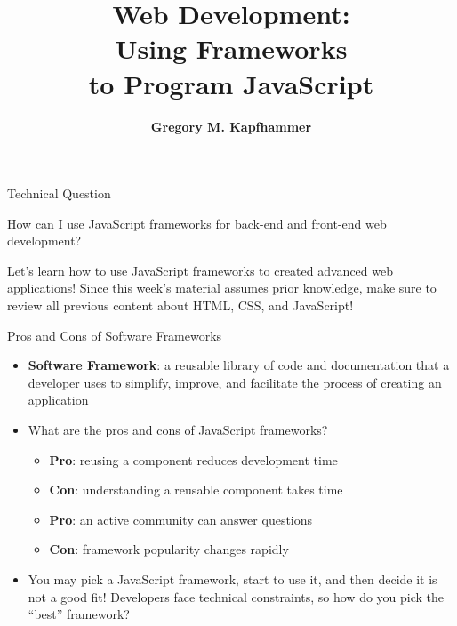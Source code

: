 \documentclass[14pt,aspectratio=169]{beamer}
\title{Web Development: \\ Using Frameworks \\ to Program JavaScript}
\author{{\bf Gregory M. Kapfhammer}}
\institute[shortinst]{{\bf Department of Computer Science, Allegheny College}}
\begin{document}
{
  \begin{frame}
    \titlepage
  \end{frame}
}

%
\begin{frame}{Technical Question}
  \hspace*{.15in}
  \begin{minipage}{5in}
    \vspace*{.5in}
    \begin{center}
      {\large How can I use JavaScript frameworks for back-end and front-end
      web development?}
    \end{center}
  \end{minipage}
  \vspace{1ex}
  \begin{center}
    \small Let's learn how to use JavaScript frameworks to created advanced web
    applications! Since this week's material assumes prior knowledge, make sure
    to review all previous content about HTML, CSS, and JavaScript! \\
  \end{center}
\end{frame}

%
\begin{frame}{Pros and Cons of Software Frameworks}
  \begin{itemize}
    \item {\bf Software Framework}: a reusable library of code and documentation
      that a developer uses to simplify, improve, and facilitate the process of
      creating an application
      \vspace*{-.15in}
    \item What are the pros and cons of JavaScript frameworks?
      \begin{itemize}
        \item {\bf Pro}: reusing a component reduces development time
        \item {\bf Con}: understanding a reusable component takes time
        \item {\bf Pro}: an active community can answer questions
        \item {\bf Con}: framework popularity changes rapidly
      \end{itemize}
      \vspace*{-.25in}
    \item You may pick a JavaScript framework, start to use it, and then decide
      it is not a good fit! Developers face technical constraints, so how do you
      pick the ``best'' framework?
  \end{itemize}
\end{frame}
\end{document}

